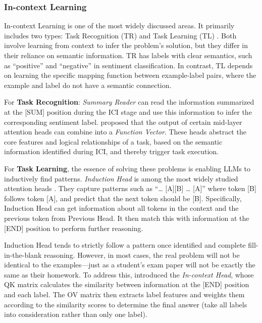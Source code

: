 \documentclass{article}
\begin{document}
\subsubsection{In-context Learning} \label{subsubsec:in-context}
In-context Learning is one of the most widely discussed areas. It primarily includes two types: Task Recognition (TR) and Task Learning (TL) \citep{ICLDisentagle_23_thesis}. Both involve learning from context to infer the problem's solution, but they differ in their reliance on semantic information. TR has labels with clear semantics, such as ``positive'' and ``negative'' in sentiment classification. In contrast, TL depends on learning the specific mapping function between example-label pairs, where the example and label do not have a semantic connection.

For \textbf{Task Recognition}: \textit{Summary Reader} \citep{Sentiment_23_arXiv_EleutherAI} can read the information summarized at the [SUM] position during the ICI stage and use this information to infer the corresponding sentiment label.
\citet{FunctionVector_24_ICLR_NEU} proposed that the output of certain mid-layer attention heads can combine into a \textit{Function Vector}. These heads abstract the core features and logical relationships of a task, based on the semantic information identified during ICI, and thereby trigger task execution.

For \textbf{Task Learning}, the essence of solving these problems is enabling LLMs to inductively find patterns.
\textit{Induction Head} is among the most widely studied attention heads \citep{InductionHeads_22_TCT_Anthropic,Markov_24_arXiv_Harvard,FSL_24_ICML_UCL,InductionHead_24_arXiv_UoA}. They capture patterns such as ``… [A][B] … [A]'' where token [B] follows token [A], and predict that the next token should be [B]. Specifically, Induction Head can get information about all tokens in the context and the previous token from Previous Head. It then match this with information at the [END] position to perform further reasoning.

Induction Head tends to strictly follow a pattern once identified and complete fill-in-the-blank reasoning. However, in most cases, the real problem will not be identical to the examples—just as a student's exam paper will not be exactly the same as their homework. To address this, \citet{WordClassification_24_arXiv_UoM} introduced the \textit{In-context Head}, whose QK matrix calculates the similarity between information at the [END] position and each label. The OV matrix then extracts label features and weights them according to the similarity scores to determine the final answer (take all labels into consideration rather than only one label).
\end{document}
